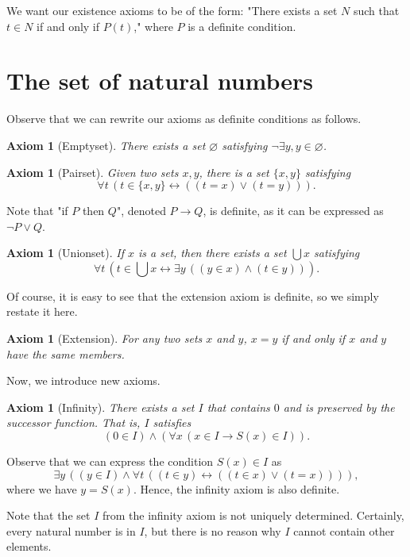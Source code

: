 \documentclass[10pt]{article}
\theoremstyle{newstyle}
\newtheorem{axiom}[thm]{Axiom}
\begin{document}
We want our existence axioms to be of the form: "There exists a set $N$ such that $t \in N$ 
if and only if $P(t)$," where $P$ is a definite condition. 

\newpage\section{The set of natural numbers} 

Observe that we can rewrite our axioms as definite conditions as follows. 

\begin{axiom}[Emptyset] 
There exists a set $\varnothing$ satisfying $\neg \exists y, y \in \varnothing$. 
\end{axiom}

\begin{axiom}[Pairset] 
Given two sets $x, y$, there is a set $\{x, y\}$ satisfying 
\[ \forall t \, (t \in \{x, y\} \leftrightarrow ((t=x) \vee (t=y))). \]
\end{axiom}
Note that "if $P$ then $Q$", denoted $P \to Q$, is definite, as it can be expressed as 
$\neg P \vee Q$. 

\begin{axiom}[Unionset] 
If $x$ is a set, then there exists a set $\bigcup x$ satisfying 
\[ \forall t \, (t \in \textstyle\bigcup x \leftrightarrow \exists y \, ((y \in x) \wedge (t \in y))). \] 
\end{axiom}

Of course, it is easy to see that the extension axiom is definite, so we simply restate it here. 

\begin{axiom}[Extension] 
For any two sets $x$ and $y$, $x = y$ if and only if $x$ and $y$ have the same members. 
\end{axiom}

Now, we introduce new axioms. 

\begin{axiom}[Infinity] 
There exists a set $I$ that contains $0$ and is preserved by the successor function. That is, 
$I$ satisfies 
\[ (0 \in I) \wedge (\forall x \, (x \in I \to S(x) \in I)). \] 
\end{axiom}

Observe that we can express the condition $S(x) \in I$ as 
\[ \exists y \, ((y \in I) \wedge \forall t \, ((t \in y) \leftrightarrow ((t \in x) \vee (t = x)))), \] 
where we have $y = S(x)$. Hence, the infinity axiom is also definite. 

Note that the set $I$ from the infinity axiom is not uniquely determined. Certainly, every 
natural number is in $I$, but there is no reason why $I$ cannot contain other elements. 
\end{document}
